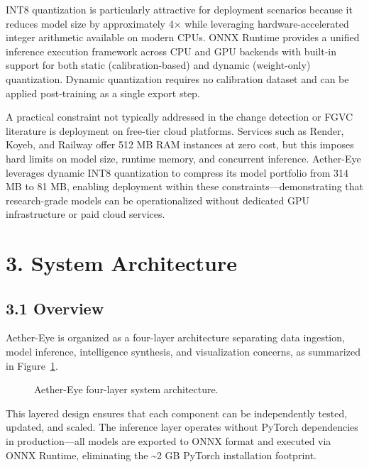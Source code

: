 \documentclass[11pt,a4paper]{article}
\begin{document}
INT8 quantization is particularly attractive for deployment scenarios because it reduces model size by approximately 4× while leveraging hardware-accelerated integer arithmetic available on modern CPUs. ONNX Runtime provides a unified inference execution framework across CPU and GPU backends with built-in support for both static (calibration-based) and dynamic (weight-only) quantization. Dynamic quantization requires no calibration dataset and can be applied post-training as a single export step.

A practical constraint not typically addressed in the change detection or FGVC literature is deployment on free-tier cloud platforms. Services such as Render, Koyeb, and Railway offer 512 MB RAM instances at zero cost, but this imposes hard limits on model size, runtime memory, and concurrent inference. Aether-Eye leverages dynamic INT8 quantization to compress its model portfolio from 314 MB to 81 MB, enabling deployment within these constraints---demonstrating that research-grade models can be operationalized without dedicated GPU infrastructure or paid cloud services.

\hypertarget{system-architecture}{%
\section{3. System Architecture}\label{system-architecture}}

\hypertarget{overview}{%
\subsection{3.1 Overview}\label{overview}}

Aether-Eye is organized as a four-layer architecture separating data ingestion, model inference, intelligence synthesis, and visualization concerns, as summarized in Figure~\ref{fig:architecture}.

\begin{figure}[t]
\centering
\resizebox{\columnwidth}{!}{}
\caption{Aether-Eye four-layer system architecture.}
\label{fig:architecture}
\end{figure}

This layered design ensures that each component can be independently tested, updated, and scaled. The inference layer operates without PyTorch dependencies in production---all models are exported to ONNX format and executed via ONNX Runtime, eliminating the \textasciitilde2 GB PyTorch installation footprint.
\end{document}
